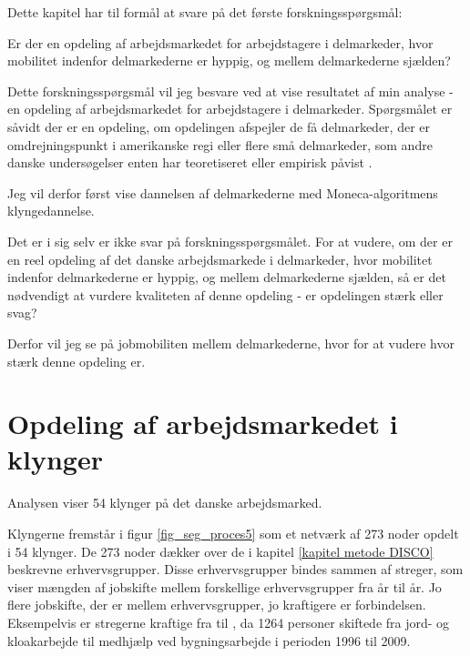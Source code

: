 Dette kapitel har til formål at svare på det første forskningsspørgsmål:

\begin{tcolorbox}[title=Forskningspørgsmål,
subtitle style={boxrule=0.4pt} ]
	 Er der en opdeling af arbejdsmarkedet for arbejdstagere i delmarkeder, hvor mobilitet indenfor delmarkederne er hyppig, og mellem delmarkederne sjælden?
\end{tcolorbox}

Dette forskningsspørgsmål vil jeg besvare ved at vise resultatet af min analyse - en opdeling af arbejdsmarkedet for arbejdstagere i delmarkeder. Spørgsmålet er såvidt der er en opdeling, om opdelingen afspejler de få delmarkeder, der er omdrejningspunkt i amerikanske regi \parencite{Piore1980, Gordon1982} eller flere små delmarkeder, som andre danske undersøgelser enten har teoretiseret eller empirisk påvist \parencite{Boje1985, Touboel2013}.

Jeg vil derfor først vise dannelsen af delmarkederne med Moneca-algoritmens klyngedannelse.

Det er i sig selv er ikke svar på forskningsspørgsmålet. For at vudere, om der er en reel opdeling af det danske arbejdsmarkede i delmarkeder, hvor mobilitet indenfor delmarkederne er hyppig, og mellem delmarkederne sjælden, så er det nødvendigt at vurdere kvaliteten af denne opdeling - er opdelingen stærk eller svag?

Derfor vil jeg se på jobmobiliten mellem delmarkederne, hvor for at vudere hvor stærk denne opdeling er. 

\section{Opdeling af arbejdsmarkedet i klynger \label{delanalyse1_endelige mobilitetskort}}

Analysen viser 54 klynger på det danske arbejdsmarked. 

Klyngerne fremstår i figur \ref{fig_seg_proces5} som et netværk af 273 noder opdelt i 54 klynger. De 273 noder dækker over de i kapitel \ref{kapitel metode DISCO} beskrevne erhvervsgrupper. Disse erhvervsgrupper bindes sammen af streger, som viser mængden af jobskifte mellem forskellige erhvervsgrupper fra år til år. Jo flere jobskifte, der er mellem erhvervsgrupper, jo kraftigere er forbindelsen. Eksempelvis er stregerne kraftige fra  til , da 1264 personer skiftede fra jord- og kloakarbejde til medhjælp ved bygningsarbejde i perioden 1996 til 2009.

